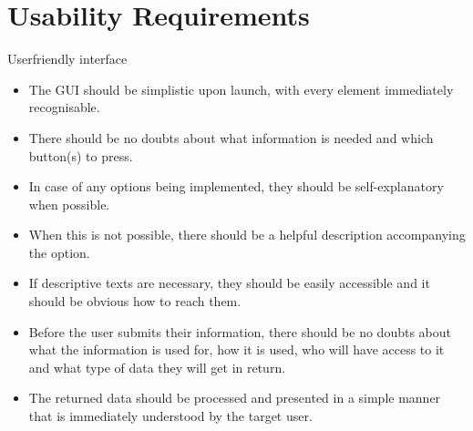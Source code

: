 \section{Usability Requirements}
\begin{requirement}{Userfriendly interface} 
\begin{itemize}
  \item The \ac{GUI} should be simplistic upon launch, with every element immediately recognisable.
  \item There should be no doubts about what information is needed and which button(s) to press.
  \item In case of any options being implemented, they should be self-explanatory when possible.
  \item When this is not possible, there should be a helpful description
  accompanying the option.
  \item If descriptive texts are necessary, they should be easily accessible and
  it should be obvious how to reach them.
  \item Before the user submits their information, there should be no doubts
  about what the information is used for, how it is used, who will have access to it and what type of data they will get in return.
  \item The returned data should be processed and presented in a simple manner that is immediately understood by the
        target user.
\end{itemize}
\end{requirement}